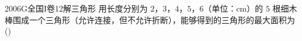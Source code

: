 
\begin{problem}{2006}{G}{全国I卷}{12}{解三角形}
用长度分别为 $2$，$3$，$4$，$5$，$6$（单位：$\text{cm}$）的 $5$ 根细木棒围成一个三角形（允许连接，但不允许折断），能够得到的三角形的最大面积为 (\hspace{1cm})
\begin{choices}
\end{choices}
\end{problem}

\begin{answer}

\end{answer}

\begin{solutions}

\end{solutions}